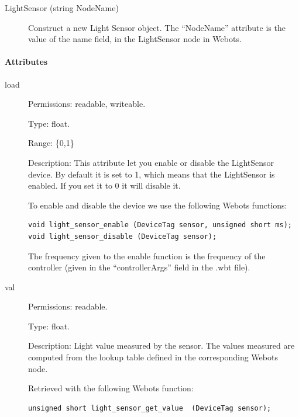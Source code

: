 \noindent
\begin{description}
\item[{LightSensor (string NodeName)}]            Construct a new Light Sensor object. The ``NodeName'' attribute is the value
          of the name field, in the LightSensor node in Webots.

\end{description}

\paragraph{Attributes}
\label{webots.uobjects.robotdevices.lightsensor.attributes}%

\noindent
\begin{description}
\item[{load}]     Permissions: readable, writeable.


  Type: float.


  Range: \{0,1\}


  Description: This attribute let you enable or disable the
  LightSensor device.  By default it is set to 1, which means that the
  LightSensor is enabled. If you set it to 0 it will disable it.


          To enable and disable the device we use the following Webots functions:


\begin{lstlisting}
void light_sensor_enable (DeviceTag sensor, unsigned short ms);
void light_sensor_disable (DeviceTag sensor);
\end{lstlisting}

          The frequency given to the enable function is the frequency of the
          \urbi controller (given in the ``controllerArgs'' field in the .wbt file).

\item[{         val
 }]            Permissions: readable.


 Type: float.


 Description: Light value measured by the sensor. The values measured
 are computed from the lookup table defined in the corresponding
 Webots node.


          Retrieved with the following Webots function:


\begin{lstlisting}
unsigned short light_sensor_get_value  (DeviceTag sensor);
\end{lstlisting}
\end{description}

